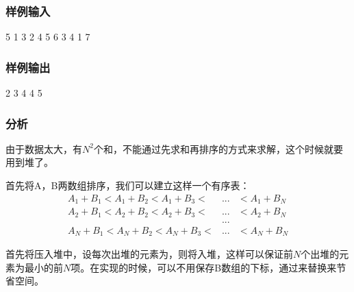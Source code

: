 \subsubsection{样例输入}
\begin{Code}
5
1 3 2 4 5 
6 3 4 1 7
\end{Code}

\subsubsection{样例输出}
\begin{Code}
2 3 4 4 5
\end{Code}

\subsubsection{分析}
由于数据太大，有$N^2$个和，不能通过先求和再排序的方式来求解，这个时候就要用到堆了。

首先将A，B两数组排序，我们可以建立这样一个有序表：
\begin{eqnarray}
A_1+B_1<A_1+B_2<A_1+B_3< &...& <A_1+B_N \nonumber \\
A_2+B_1<A_2+B_2<A_2+B_3< &...& <A_2+B_N \nonumber \\
& ...  \nonumber \\
A_N+B_1<A_N+B_2<A_N+B_3< &...& <A_N+B_N \nonumber
\end{eqnarray}

首先将压入堆中，设每次出堆的元素为，则将入堆，这样可以保证前$N$个出堆的元素为最小的前$N$项。在实现的时候，可以不用保存B数组的下标，通过来替换来节省空间。


